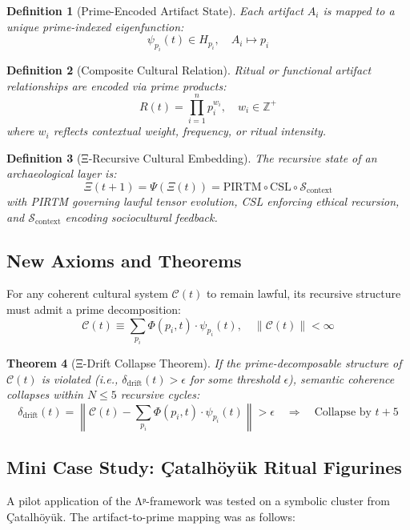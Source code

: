 \documentclass[12]{amsart}
\theoremstyle{plain}
\newtheorem{theorem}{Theorem}[section]
\newtheorem{definition}[theorem]{Definition}
\begin{document}
\begin{definition}[Prime-Encoded Artifact State]
Each artifact $A_i$ is mapped to a unique prime-indexed eigenfunction:
\[
\psi_{p_i}(t) \in H_{p_i}, \quad A_i \longmapsto p_i
\]
\end{definition}

\begin{definition}[Composite Cultural Relation]
Ritual or functional artifact relationships are encoded via prime products:
\[
R(t) = \prod_{i=1}^n p_i^{w_i}, \quad w_i \in \mathbb{Z}^+
\]
where $w_i$ reflects contextual weight, frequency, or ritual intensity.
\end{definition}

\begin{definition}[Ξ-Recursive Cultural Embedding]
The recursive state of an archaeological layer is:
\[
\Xi(t+1) = \Psi(\Xi(t)) = \text{PIRTM} \circ \text{CSL} \circ \mathcal{S}_{\text{context}}
\]
with PIRTM governing lawful tensor evolution, CSL enforcing ethical recursion, and $\mathcal{S}_{\text{context}}$ encoding sociocultural feedback.
\end{definition}

\subsection{New Axioms and Theorems}

\begin{axiom}
For any coherent cultural system $\mathcal{C}(t)$ to remain lawful, its recursive structure must admit a prime decomposition:
\[
\mathcal{C}(t) \equiv \sum_{p_i} \Phi(p_i, t) \cdot \psi_{p_i}(t), \quad \| \mathcal{C}(t) \| < \infty
\]
\end{axiom}

\begin{theorem}[Ξ-Drift Collapse Theorem]
If the prime-decomposable structure of $\mathcal{C}(t)$ is violated (i.e., $\delta_{\text{drift}}(t) > \epsilon$ for some threshold $\epsilon$), semantic coherence collapses within $N \leq 5$ recursive cycles:
\[
\delta_{\text{drift}}(t) = \left\| \mathcal{C}(t) - \sum_{p_i} \Phi(p_i, t) \cdot \psi_{p_i}(t) \right\| > \epsilon \quad \Rightarrow \quad \text{Collapse by } t+5
\]
\end{theorem}

\subsection{Mini Case Study: Çatalhöyük Ritual Figurines}
A pilot application of the Λᵖ-framework was tested on a symbolic cluster from Çatalhöyük. The artifact-to-prime mapping was as follows:
\end{document}
